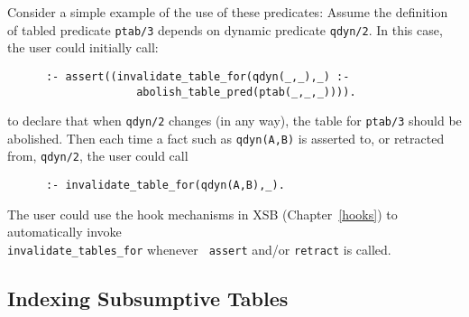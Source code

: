 \begin{description}
\begin{description}
Consider a simple example of the use of these predicates: Assume the
definition of tabled predicate {\tt ptab/3} depends on dynamic predicate
{\tt qdyn/2}.  In this case, the user could initially call:
\begin{verbatim}
      :- assert((invalidate_table_for(qdyn(_,_),_) :-
                    abolish_table_pred(ptab(_,_,_)))).
\end{verbatim}
to declare that when {\tt qdyn/2} changes (in any way), the table for {\tt ptab/3}
should be abolished.  Then each time a fact such as {\tt qdyn(A,B)} is
asserted to, or retracted from, {\tt qdyn/2}, the user could call
\begin{verbatim}
      :- invalidate_table_for(qdyn(A,B),_).
\end{verbatim}

The user could use the hook mechanisms in XSB (Chapter~\ref{hooks}) to
automatically invoke \\ {\tt invalidate\_tables\_for} whenever {\tt
  assert} and/or {\tt retract} is called.



\subsection{Indexing Subsumptive Tables} \label{sec:table-index}




\end{description}
\end{description}

